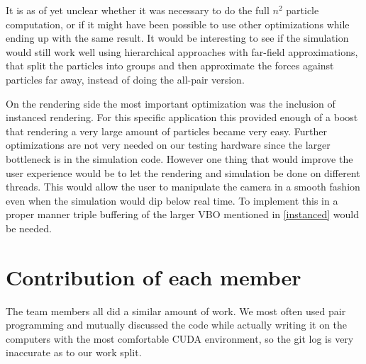 \documentclass[a4paper]{article}
\begin{document}
It is as of yet unclear whether it was necessary to do the full $n^2$ particle computation, or if it might have been possible to use other optimizations while ending up with the same result.
It would be interesting to see if the simulation would still work well using hierarchical approaches with far-field approximations, that split the particles into groups and then approximate the forces against particles far away, instead of doing the all-pair version.

On the rendering side the most important optimization was the inclusion of instanced rendering.
For this specific application this provided enough of a boost that rendering a very large amount of particles became very easy.
Further optimizations are not very needed on our testing hardware since the larger bottleneck is in the simulation code.
However one thing that would improve the user experience would be to let the rendering and simulation be done on different threads. 
This would allow the user to manipulate the camera in a smooth fashion even when the simulation would dip below real time. 
To implement this in a proper manner triple buffering of the larger VBO mentioned in \ref{instanced} would be needed. 

\section{Contribution of each member}
The team members all did a similar amount of work.
We most often used pair programming and mutually discussed the code while actually writing it on the computers with the most comfortable CUDA environment, so the git log is very inaccurate as to our work split.



\end{document}
